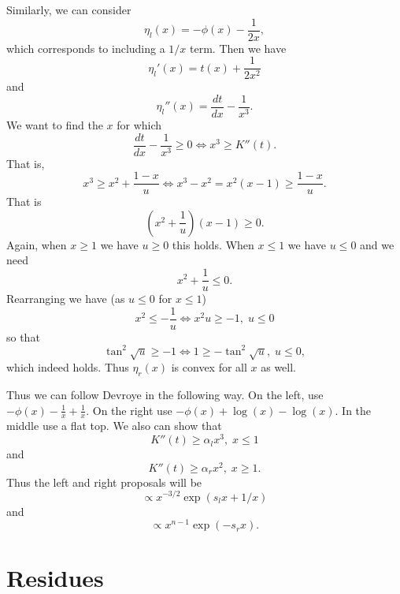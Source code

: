 \documentclass[12pt]{article}
\newcommand{\dd}[2]{\frac{d #1}{d #2}}
\begin{document}
Similarly, we can consider
\[
\eta_l(x) = - \phi(x) - \frac{1}{2x},
\]
which corresponds to including a $1/x$ term.  Then we have
\[
\eta_l'(x) = t(x) + \frac{1}{2x^2}
\]
and
\[
\eta_l''(x) = \dd{t}{x} - \frac{1}{x^3}.
\]
We want to find the $x$ for which
\[
\dd{t}{x} - \frac{1}{x^3} \geq 0 \iff x^3 \geq K''(t).
\]
That is,
\[
x^3 \geq x^2 + \frac{1-x}{u} \iff x^3 - x^2 = x^2 (x-1) \geq \frac{1-x}{u}.
\]
That is
\[
(x^2 + \frac{1}{u}) (x-1) \geq 0.
\]
Again, when $x \geq 1$ we have $u \geq 0$ this holds.  When $x \leq 1$ we have
$u \leq 0$ and we need
\[
x^2 + \frac{1}{u} \leq 0.
\]
Rearranging we have (as $u \leq 0$ for $x \leq 1$)
\[
x^2 \leq - \frac{1}{u} \iff x^2 u \geq -1,  \; u \leq 0
\]
so that
\[
\tan^2 \sqrt{u} \geq -1 \iff 1 \geq -\tan^2{\sqrt{u}}, \; u \leq 0,
\]
which indeed holds.  Thus $\eta_r(x)$ is convex for all $x$ as well.

Thus we can follow Devroye in the following way.  On the left, use $-\phi(x) -
\frac{1}{x} + \frac{1}{x}$.  On the right use $-\phi(x) + \log(x) - \log(x)$.
In the middle use a flat top.  We also can show that
\[
K''(t) \geq \alpha_l x^3, \; x \leq 1
\]
and
\[
K''(t) \geq \alpha_r x^2, \; x \geq 1.
\]
Thus the left and right proposals will be
\[
\propto x^{-3/2} \exp( s_l x + 1/x )
\]
and
\[
\propto x^{n-1} \exp (- s_r x).
\]

\section{Residues}
\end{document}

